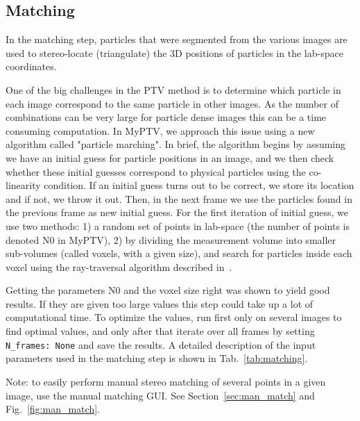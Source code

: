 \documentclass[10pt,a4paper]{article}
\begin{document}
%
%








\subsection{Matching}\label{sec:workflow_match}

In the matching step, particles that were segmented from the various images are used to stereo-locate (triangulate) the 3D positions of particles in the lab-space coordinates. 



One of the big challenges in the PTV method is to determine which particle in each image correspond to the same particle in other images. As the number of combinations can be very large for particle dense images this can be a time consuming computation. In MyPTV, we approach this issue using a new algorithm called "particle marching". In brief, the algorithm begins by assuming we have an initial guess for particle positions in an image, and we then check whether these initial guesses correspond to physical particles using the co-linearity condition. If an initial guess turns out to be correct, we store its location and if not, we throw it out. Then, in the next frame we use the particles found in the previous frame as new initial guess. For the first iteration of initial guess, we use two methods: 1) a random set of points in lab-space (the number of points is denoted N0 in MyPTV), 2) by dividing the measurement volume into smaller sub-volumes (called voxels, with a given size), and search for particles inside each voxel using the ray-traversal algorithm described in~\cite{Bourgoin2020}.
     

Getting the parameters N0 and the voxel size right was shown to yield good results. If they are given too large values this step could take up a lot of computational time. To optimize the values, run first only on several images to find optimal values, and only after that iterate over all frames by setting \texttt{N\_frames: None} and save the results. 
A detailed description of the input parameters used in the matching step is shown in Tab.~\ref{tab:matching}.


Note: to easily perform manual stereo matching of several points in a given image, use the manual matching GUI. See Section~\ref{sec:man_match} and Fig.~\ref{fig:man_match}.
\end{document}
